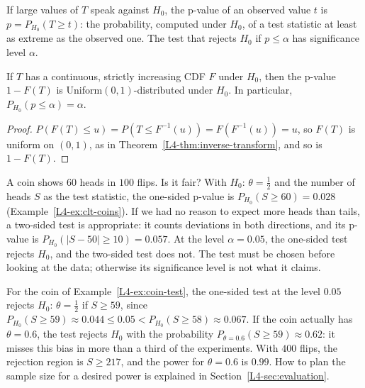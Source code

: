 \begin{definition}[p-value]\label{L4-def:p-value}
    If large values of $T$ speak against $H_0$, the p-value of an observed value $t$ is $p = P_{H_0}(T \geq t)$: the probability, computed under $H_0$, of a test statistic at least as extreme as the observed one. The test that rejects $H_0$ if $p \leq \alpha$ has significance level $\alpha$.
\end{definition}

\begin{proposition}\label{L4-prop:p-uniform}
    If $T$ has a continuous, strictly increasing CDF $F$ under $H_0$, then the p-value $1 - F(T)$ is Uniform$(0, 1)$-distributed under $H_0$. In particular, $P_{H_0}(p \leq \alpha) = \alpha$.
\end{proposition}

\begin{proof}
    $P(F(T) \leq u) = P(T \leq F^{-1}(u)) = F(F^{-1}(u)) = u$, so $F(T)$ is uniform on $(0, 1)$, as in Theorem~\ref{L4-thm:inverse-transform}, and so is $1 - F(T)$.
\end{proof}

\begin{example}\label{L4-ex:coin-test}
    A coin shows $60$ heads in $100$ flips. Is it fair? With $H_0$: $\theta = \frac{1}{2}$ and the number of heads $S$ as the test statistic, the one-sided p-value is $P_{H_0}(S \geq 60) = 0.028$ (Example~\ref{L4-ex:clt-coins}). If we had no reason to expect more heads than tails, a two-sided test is appropriate: it counts deviations in both directions, and its p-value is $P_{H_0}(|S - 50| \geq 10) = 0.057$. At the level $\alpha = 0.05$, the one-sided test rejects $H_0$, and the two-sided test does not. The test must be chosen before looking at the data; otherwise its significance level is not what it claims.
\end{example}

\begin{example}[Power]\label{L4-ex:power}
    For the coin of Example~\ref{L4-ex:coin-test}, the one-sided test at the level $0.05$ rejects $H_0$: $\theta = \frac{1}{2}$ if $S \geq 59$, since $P_{H_0}(S \geq 59) \approx 0.044 \leq 0.05 < P_{H_0}(S \geq 58) \approx 0.067$. If the coin actually has $\theta = 0.6$, the test rejects $H_0$ with the probability $P_{\theta = 0.6}(S \geq 59) \approx 0.62$: it misses this bias in more than a third of the experiments. With $400$ flips, the rejection region is $S \geq 217$, and the power for $\theta = 0.6$ is $0.99$. How to plan the sample size for a desired power is explained in Section~\ref{L4-sec:evaluation}.
\end{example}

